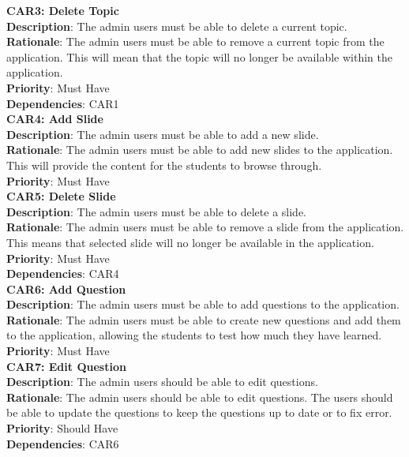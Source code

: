 \documentclass{l3proj}
\begin{document}
\textbf{CAR3: Delete Topic}\\
\textbf{Description}: The admin users must be able to delete a current topic. \\
\textbf{Rationale}: The admin users must be able to remove a current topic from the application. This will mean that the topic will no longer be available within the application.\\
\textbf{Priority}: Must Have \\
\textbf{Dependencies}: CAR1\\

\textbf{CAR4: Add Slide}\\
\textbf{Description}:  The admin users must be able to add a new slide. \\
\textbf{Rationale}: The admin users must be able to add new slides to the application. This will provide the content for the students to browse through. \\
\textbf{Priority}: Must Have\\

\textbf{CAR5: Delete Slide}\\
\textbf{Description}: The admin users must be able to delete a slide.\\ 
\textbf{Rationale}: The admin users must be able to remove a slide from the application. This means that selected slide will no longer be available in the application.\\
\textbf{Priority}: Must Have\\
\textbf{Dependencies}: CAR4\\

\textbf{CAR6: Add Question}\\
\textbf{Description}: The admin users must be able to add questions to the application. \\
\textbf{Rationale}: The admin users must be able to create new questions and add them to the application, allowing the students to test how much they have learned.\\
\textbf{Priority}: Must Have\\

\textbf{CAR7: Edit Question}\\
\textbf{Description}: The admin users should be able to edit questions.\\
\textbf{Rationale}: The admin users should be able to edit questions. The users should be able to update the questions to keep the questions up to date or to fix error.\\
\textbf{Priority}: Should Have \\
\textbf{Dependencies}: CAR6\\
\end{document}
